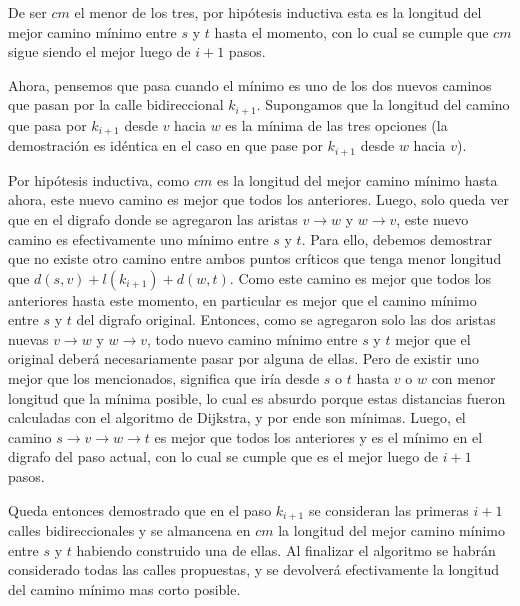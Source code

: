 De ser $cm$ el menor de los tres, por hipótesis inductiva esta es la longitud del mejor camino mínimo entre $s$ y $t$ hasta el momento, con lo cual se cumple que $cm$ sigue siendo el mejor luego de $i+1$ pasos.

\vspace{1em}

Ahora, pensemos que pasa cuando el mínimo es uno de los dos nuevos caminos que pasan por la calle bidireccional $k_{i+1}$. Supongamos que la longitud del camino que pasa por $k_{i+1}$ desde $v$ hacia $w$ es la mínima de las tres opciones (la demostración es idéntica en el caso en que pase por $k_{i+1}$ desde $w$ hacia $v$). 

\vspace{1em}

Por hipótesis inductiva, como $cm$ es la longitud del mejor camino mínimo hasta ahora, este nuevo camino es mejor que todos los anteriores. Luego, solo queda ver que en el digrafo donde se agregaron las aristas $v \rightarrow w$ y $w \rightarrow v$, este nuevo camino es efectivamente uno mínimo entre $s$ y $t$. Para ello, debemos demostrar que no existe otro camino entre ambos puntos críticos que tenga menor longitud que $d(s,v) + l(k_{i+1}) + d(w,t)$. Como este camino es mejor que todos los anteriores hasta este momento, en particular es mejor que el camino mínimo entre $s$ y $t$ del digrafo original. Entonces, como se agregaron solo las dos aristas nuevas $v \rightarrow w$ y $w \rightarrow v$, todo nuevo camino mínimo entre $s$ y $t$ mejor que el original deberá necesariamente pasar por alguna de ellas. Pero de existir uno mejor que los mencionados, significa que iría desde $s$ o $t$ hasta $v$ o $w$ con menor longitud que la mínima posible, lo cual es absurdo porque estas distancias fueron calculadas con el algoritmo de Dijkstra, y por ende son mínimas. Luego, el camino $s \rightarrow v \rightarrow w \rightarrow t$ es mejor que todos los anteriores y es el mínimo en el digrafo del paso actual, con lo cual se cumple que es el mejor luego de $i+1$ pasos.

\vspace{1em}

Queda entonces demostrado que en el paso $k_{i+1}$ se consideran las primeras $i+1$ calles bidireccionales y se almancena en $cm$ la longitud del mejor camino mínimo entre $s$ y $t$ habiendo construido una de ellas. Al finalizar el algoritmo se habrán considerado todas las calles propuestas, y se devolverá efectivamente la longitud del camino mínimo mas corto posible.


